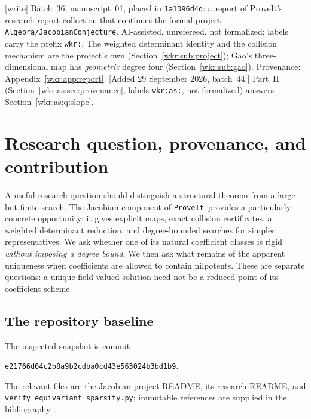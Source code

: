 \documentclass[11pt,a4paper]{article}
\numberwithin{equation}{section}
\theoremstyle{definition}
\theoremstyle{remark}
\newcommand{\repo}{\texttt{ProveIt}}
\newcommand{\wtag}{\textup{[write]}}%
\newcommand{\rpath}[1]{\nolinkurl{#1}}
\begin{document}
\begin{titlepage}
\smallskip
\noindent\wtag{} Batch~36, manuscript~01, placed in \texttt{1a1396d4d}: a
report of ProveIt's research-report collection that continues the formal
project \rpath{Algebra/JacobianConjecture}. AI-assisted, unrefereed, not
formalized; labels carry the prefix \texttt{wkr:}. The weighted
determinant identity and the collision mechanism are the project's own
(Section~\ref{wkr:sub:project}); Gao's three-dimensional map has
\emph{geometric} degree four (Section~\ref{wkr:sub:gao}). Provenance:
Appendix~\ref{wkr:app:report}. [Added 29 September 2026, batch~44:]
Part~II (Section~\ref{wkr:as:sec:provenance}, labels \texttt{wkr:as:},
not formalized) answers Section~\ref{wkr:as:q:slope}.
\end{titlepage}
\hypersetup{pageanchor=true}

\begingroup
\footnotesize
\setlength{\parskip}{0pt}
\tableofcontents
\endgroup
\newpage

\section{Research question, provenance, and contribution}
\label{wkr:sec:intro}

A useful research question should distinguish a structural theorem from a
large but finite search. The Jacobian component of \repo\ provides a
particularly concrete opportunity: it gives explicit maps, exact collision
certificates, a weighted determinant reduction, and degree-bounded searches
for simpler representatives. We ask whether one of its natural coefficient
classes is rigid \emph{without imposing a degree bound}. We then ask what
remains of the apparent uniqueness when coefficients are allowed to contain
nilpotents. These are separate questions: a unique field-valued solution
need not be a reduced point of its coefficient scheme.

\subsection{The repository baseline}

The inspected snapshot is commit
\begin{center}
\texttt{e21766d04c2b8a9b2cdba0cd43e563024b3bd1b9}.
\end{center}
The relevant files are the Jacobian project README, its research README, and
\texttt{verify\_equivariant\_sparsity.py}; immutable references are supplied
in the bibliography \cite{repo-main,repo-research,repo-sparsity}.
\end{document}
